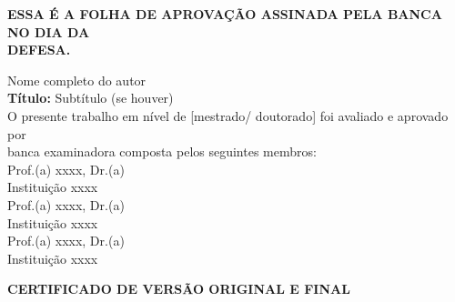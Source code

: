 \documentclass[
	12pt,			%
	oneside,
	a4paper,		%
	english,		%
	brazil,			%
	]{article}
\numberwithin{equation}{section}
\begin{document}
\begin{folhadeaprovacao}\begin{center}
\textbf{ESSA É A FOLHA DE APROVAÇÃO ASSINADA PELA BANCA NO DIA DA \\
DEFESA.}
\end{center}
\begin{center}
Nome completo do autor \\
\textbf{Título:} Subtítulo (se houver) \\
\vspace*{1cm}
O presente trabalho em nível de [mestrado/ doutorado] foi avaliado e aprovado por \\
banca examinadora composta pelos seguintes membros: \\
\vspace*{1cm}
Prof.(a) xxxx, Dr.(a) \\
Instituição xxxx \\
\vspace*{1cm}
Prof.(a) xxxx, Dr.(a) \\
Instituição xxxx \\
\vspace*{1cm}
Prof.(a) xxxx, Dr.(a) \\
Instituição xxxx \\
\vfill
\end{center}
\thispagestyle{empty}
\end{folhadeaprovacao}
\newpage
\begin{center}
\textbf{CERTIFICADO DE VERSÃO ORIGINAL E FINAL}
\end{center}
\end{document}
